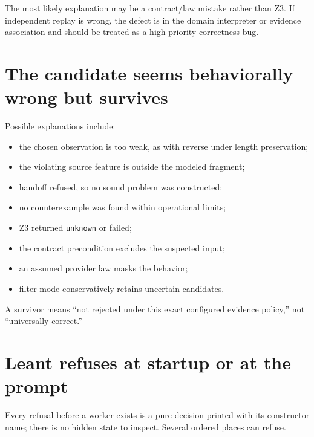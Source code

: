 \documentclass[10pt,letterpaper,oneside]{report}
\newcommand{\unknown}{\texttt{unknown}}
\begin{document}
The most likely explanation may be a contract/law mistake rather than Z3. If independent replay is wrong, the defect is in the domain interpreter or evidence association and should be treated as a high-priority correctness bug.

\section{The candidate seems behaviorally wrong but survives}

Possible explanations include:

\begin{itemize}
\item the chosen observation is too weak, as with reverse under length preservation;
\item the violating source feature is outside the modeled fragment;
\item handoff refused, so no sound problem was constructed;
\item no counterexample was found within operational limits;
\item Z3 returned \unknown{} or failed;
\item the contract precondition excludes the suspected input;
\item an assumed provider law masks the behavior;
\item filter mode conservatively retains uncertain candidates.
\end{itemize}

A survivor means ``not rejected under this exact configured evidence policy,'' not ``universally correct.''

\section{Leant refuses at startup or at the prompt}
\label{sec:ts-startup}

Every refusal before a worker exists is a pure decision printed with its constructor name; there is no hidden state to inspect. Several ordered places can refuse.
\end{document}

